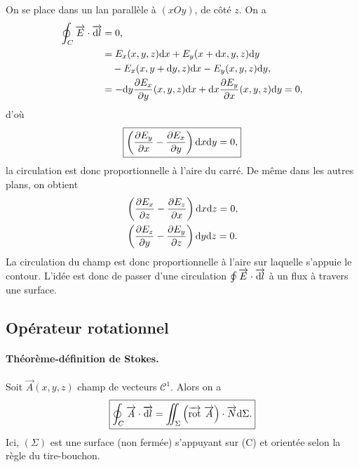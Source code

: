         On se place dans un lan parallèle à $(xOy)$, de côté $z$. On a 
        \begin{align*}
            \oint_{C}\protect\overrightarrow{{E}}\cdot\protect\overrightarrow{{\mathrm{d} l}}
            &=0,\\
            &=
            E_x(x,y,z)\mathrm{d} x+E_y(x+\mathrm{d} x,y,z)\mathrm{d} y\\
            &\quad-E_x(x,y+\mathrm{d} y,z)\mathrm{d} x-E_y(x,y,z)\mathrm{d} y,\\
            &=
            -\mathrm{d} y\frac{\partial E_x}{\partial y}(x,y,z)\mathrm{d} x+\mathrm{d} x\frac{\partial E_y}{\partial x}(x,y,z)\mathrm{d} y=0,
        \end{align*}
        d'où
        \begin{equation*}
            \boxed{
            \left(\frac{\partial E_y}{\partial x}-\frac{\partial E_x}{\partial y}\right)\mathrm{d} x\mathrm{d} y=0,}
        \end{equation*}
        la circulation est donc proportionnelle à l'aire du carré. De même dans les autres plans, on obtient
        \begin{equation*}
            \begin{aligned}
                &\left(\frac{\partial E_x}{\partial z}-\frac{\partial E_z}{\partial x}\right)\mathrm{d} x\mathrm{d} z=0,\\
                &\left(\frac{\partial E_z}{\partial y}-\frac{\partial E_y}{\partial z}\right)\mathrm{d} y\mathrm{d} z=0.
            \end{aligned}
        \end{equation*}
        La circulation du champ est donc proportionnelle à l'aire sur laquelle s'appuie le contour. L'idée est donc de passer d'une circulation $\oint\protect\overrightarrow{{E}}\cdot\protect\overrightarrow{{\mathrm{d} l}}$ à un flux à travers une surface.

    \subsection{Opérateur rotationnel}

        \paragraph{Théorème-définition de Stokes.}

            Soit $\vec{A}(x,y,z)$ champ de vecteurs $\mathcal{C}^{1}$. Alors on a 
            \begin{equation*}
                \boxed{
                    \oint_{C}\protect\overrightarrow{{A}}\cdot\protect\overrightarrow{{\mathrm{d} l}}=\iint_{\Sigma}\left(\protect\overrightarrow{{\mathrm{rot}}}~\protect\overrightarrow{{A}}\right)\cdot\protect\overrightarrow{{N}}\mathrm{d}\Sigma.
                }
            \end{equation*}
            Ici, $(\Sigma)$ est une surface (non fermée) s'appuyant sur (C) et orientée selon la règle du tire-bouchon.

